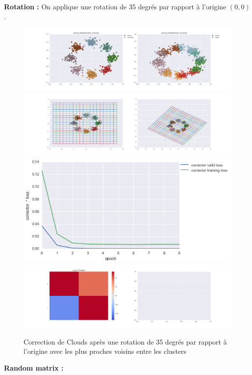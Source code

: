 
{\Large \textbf{Rotation :}} On applique une rotation de 35 degrés par rapport à l'origine $(0,0)$.

\begin{figure}[H] %
\centering
\includegraphics[width=\linewidth]{fig/24-05-2016/clouds/Clouds_RotatedCluster_Corrector-DATA.png}
\includegraphics[width=\linewidth]{fig/24-05-2016/clouds/Clouds_RotatedCluster_Corrector-GridCheck.png}
\includegraphics[width=0.45\linewidth]{fig/24-05-2016/clouds/Clouds_RotatedCluster_Corrector-Learning_curve.png}
\includegraphics[width=\linewidth]{fig/24-05-2016/clouds/Clouds_RotatedCluster_Corrector-W.png}
\caption{Correction de Clouds après une rotation de 35 degrés par rapport à l'origine avec les plus proches voisins entre les clusters}
\label{fig:recap-clouds-rot-cluster}
\end{figure}

{\Large \textbf{Random matrix :}}

